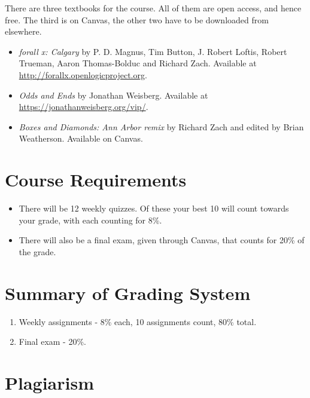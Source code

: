 \documentclass[
]{article}
\providecommand{\tightlist}{%
  \setlength{\itemsep}{0pt}\setlength{\parskip}{0pt}}
\begin{document}
There are three textbooks for the course. All of them are open access,
and hence free. The third is on Canvas, the other two have to be
downloaded from elsewhere.

\begin{itemize}
\tightlist
\item
  \emph{forall x: Calgary} by P. D. Magnus, Tim Button, J. Robert
  Loftis, Robert Trueman, Aaron Thomas-Bolduc and Richard Zach.
  Available at \url{http://forallx.openlogicproject.org}.
\item
  \emph{Odds and Ends} by Jonathan Weisberg. Available at
  \url{https://jonathanweisberg.org/vip/}.
\item
  \emph{Boxes and Diamonds: Ann Arbor remix} by Richard Zach and edited
  by Brian Weatherson. Available on Canvas.
\end{itemize}

\newpage

\hypertarget{course-requirements}{%
\section{Course Requirements}\label{course-requirements}}

\begin{itemize}
\tightlist
\item
  There will be 12 weekly quizzes. Of these your best 10 will count
  towards your grade, with each counting for 8\%.
\item
  There will also be a final exam, given through Canvas, that counts for
  20\% of the grade.
\end{itemize}

\hypertarget{summary-of-grading-system}{%
\section{Summary of Grading System}\label{summary-of-grading-system}}

\begin{enumerate}
\def\labelenumi{\arabic{enumi}.}
\tightlist
\item
  Weekly assignments - 8\% each, 10 assignments count, 80\% total.
\item
  Final exam - 20\%.
\end{enumerate}

\hypertarget{plagiarism}{%
\section{Plagiarism}\label{plagiarism}}
\end{document}
